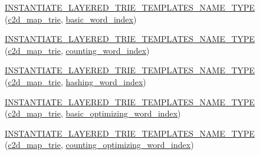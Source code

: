 \begin{DoxyCompactItemize}
\item 
\hyperlink{namespaceuva_1_1smt_1_1bpbd_1_1server_1_1lm_a71c07af9301fda4871a34b4c2abd9a6f}{I\+N\+S\+T\+A\+N\+T\+I\+A\+T\+E\+\_\+\+L\+A\+Y\+E\+R\+E\+D\+\_\+\+T\+R\+I\+E\+\_\+\+T\+E\+M\+P\+L\+A\+T\+E\+S\+\_\+\+N\+A\+M\+E\+\_\+\+T\+Y\+P\+E} (\hyperlink{classuva_1_1smt_1_1bpbd_1_1server_1_1lm_1_1c2d__map__trie}{c2d\+\_\+map\+\_\+trie}, \hyperlink{classuva_1_1smt_1_1bpbd_1_1server_1_1lm_1_1dictionary_1_1basic__word__index}{basic\+\_\+word\+\_\+index})
\item 
\hyperlink{namespaceuva_1_1smt_1_1bpbd_1_1server_1_1lm_aebf8694723151de076dae99cf8b15cf8}{I\+N\+S\+T\+A\+N\+T\+I\+A\+T\+E\+\_\+\+L\+A\+Y\+E\+R\+E\+D\+\_\+\+T\+R\+I\+E\+\_\+\+T\+E\+M\+P\+L\+A\+T\+E\+S\+\_\+\+N\+A\+M\+E\+\_\+\+T\+Y\+P\+E} (\hyperlink{classuva_1_1smt_1_1bpbd_1_1server_1_1lm_1_1c2d__map__trie}{c2d\+\_\+map\+\_\+trie}, \hyperlink{classuva_1_1smt_1_1bpbd_1_1server_1_1lm_1_1dictionary_1_1counting__word__index}{counting\+\_\+word\+\_\+index})
\item 
\hyperlink{namespaceuva_1_1smt_1_1bpbd_1_1server_1_1lm_a5979306c74f15e3bcbb448e0212ebf5c}{I\+N\+S\+T\+A\+N\+T\+I\+A\+T\+E\+\_\+\+L\+A\+Y\+E\+R\+E\+D\+\_\+\+T\+R\+I\+E\+\_\+\+T\+E\+M\+P\+L\+A\+T\+E\+S\+\_\+\+N\+A\+M\+E\+\_\+\+T\+Y\+P\+E} (\hyperlink{classuva_1_1smt_1_1bpbd_1_1server_1_1lm_1_1c2d__map__trie}{c2d\+\_\+map\+\_\+trie}, \hyperlink{classuva_1_1smt_1_1bpbd_1_1server_1_1lm_1_1dictionary_1_1hashing__word__index}{hashing\+\_\+word\+\_\+index})
\item 
\hyperlink{namespaceuva_1_1smt_1_1bpbd_1_1server_1_1lm_aeeda73c78e867d9334cf2aad89443e8e}{I\+N\+S\+T\+A\+N\+T\+I\+A\+T\+E\+\_\+\+L\+A\+Y\+E\+R\+E\+D\+\_\+\+T\+R\+I\+E\+\_\+\+T\+E\+M\+P\+L\+A\+T\+E\+S\+\_\+\+N\+A\+M\+E\+\_\+\+T\+Y\+P\+E} (\hyperlink{classuva_1_1smt_1_1bpbd_1_1server_1_1lm_1_1c2d__map__trie}{c2d\+\_\+map\+\_\+trie}, \hyperlink{namespaceuva_1_1smt_1_1bpbd_1_1server_1_1lm_1_1dictionary_a3001583c904eec702b4a4125082a7ecd}{basic\+\_\+optimizing\+\_\+word\+\_\+index})
\item 
\hyperlink{namespaceuva_1_1smt_1_1bpbd_1_1server_1_1lm_ab0502b6fa8dda3b08855812e1927bcf5}{I\+N\+S\+T\+A\+N\+T\+I\+A\+T\+E\+\_\+\+L\+A\+Y\+E\+R\+E\+D\+\_\+\+T\+R\+I\+E\+\_\+\+T\+E\+M\+P\+L\+A\+T\+E\+S\+\_\+\+N\+A\+M\+E\+\_\+\+T\+Y\+P\+E} (\hyperlink{classuva_1_1smt_1_1bpbd_1_1server_1_1lm_1_1c2d__map__trie}{c2d\+\_\+map\+\_\+trie}, \hyperlink{namespaceuva_1_1smt_1_1bpbd_1_1server_1_1lm_1_1dictionary_a61cbd647b15de785ccf4cdd26661c366}{counting\+\_\+optimizing\+\_\+word\+\_\+index})
\item 

\end{DoxyCompactItemize}
